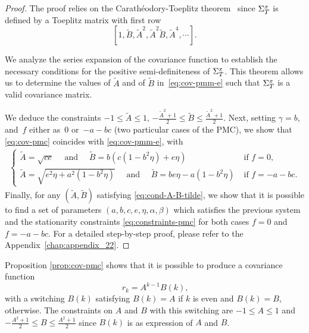 \begin{proof}
    The proof relies on the Carathéodory-Toeplitz
    theorem~\citep{akhiezer1965classical}  since $\Sigma^{x}_{T}$ is defined
    by a Toeplitz matrix with first row 
    $$[1,\tilde{B},\tilde{A}^2, \tilde{A}^2 \tilde{B}, \tilde{A}^4, \cdots].$$ 

    We analyze the series expansion of the covariance function to establish
    the necessary conditions for the positive semi-definiteness of $\Sigma^{x}_{T}$. 
    This theorem allows us to determine the values of $\tilde A$ and of
    $\tilde{B}$ in~\eqref{eq:cov-pmm-e} 
    such that $\Sigma^{x}_{T}$ is a valid covariance matrix.

    We deduce
    the constraints $-1  \leq \tilde A \leq  1$, 
    $ -\frac{ \tilde A^2 +1}{2} \leq \tilde{B} \leq \frac{ \tilde A^2 +1}{2} $. 
    Next, 
    setting $\gamma=b$, and~$f$ either as~$0$ or~$-a-bc$ (two particular cases of the PMC),
    we show that \eqref{eq:cov-pmc} coincides
    with \eqref{eq:cov-pmm-e}, with 
    \begin{eqnarray*}
        \left\{
       \begin{matrix}
       \tilde A=\sqrt{ce} \quad \text{ and } \quad \tilde{B}=b(c(1-b^2\eta)+e\eta)  & \;  \text{if } f = 0 \text{,} \\ 
       \tilde A=\sqrt{e^2\eta + a^2(1 -b^2\eta )}\quad \text{ and } \quad \tilde{B}= be\eta - a (1-b^2\eta) & \; \text{if } f = -a-bc  \text{.}
       \end{matrix} \right.
    \end{eqnarray*}
    Finally, for any $(\tilde A,\tilde{B})$ satisfying \eqref{eq:cond-A-B-tilde},
    we show that it is possible to find a set of parameters $(a,b,c,e,\eta,\alpha,\beta)$
    which satisfies the previous system and the stationarity constraints \eqref{eq:constraints-pmc}
    for both cases $f=0$ and $f=-a-bc$.
    For a detailed
    step-by-step proof, please refer to the Appendix~\ref{chap:appendix_22}.
\end{proof}

Proposition \ref{prop:cov-pmc} shows that it is possible 
to produce a covariance function
$$r_{k}=A^{k-1} B(k) \text{,}$$ 
with a switching $B(k)$ satisfying $B(k)=A$ if $k$ is even and
$B(k)=B$, otherwise.
The constraints on $A$ and $B$ with this switching are
$-1 \leq A \leq 1$ and $-\frac{A^2+1}{2} \leq B \leq \frac{A^2+1}{2}$ 
since $B(k)$ is as expression of $A$ and $B$. \\

